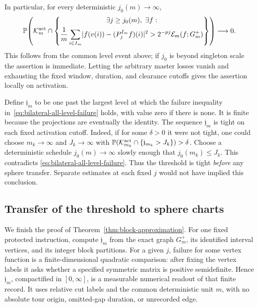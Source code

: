 In particular, for every deterministic \(j_0(m)\to\infty\),
\begin{equation}
\label{eq:bilateral-all-level-failure}
 \mathbb P\!\left(
 \mathcal K_m^{\mathrm{act}}\cap
 \left\{
 \begin{gathered}
 \exists j\ge j_0(m),\ \exists f:\\
 \frac1m\sum_{i\in I_m}
 \lvert f(v(i))-(P_j^{I_m}f)(i)\rvert^2
 >2^{-pj}\mathcal E_m(f;G_m^+)
 \end{gathered}
 \right\}\right)\longrightarrow0.
\end{equation}
This follows from the common level event above;
if \(j_0\) is beyond singleton scale the assertion is
immediate.  Letting the arbitrary master losses vanish and
exhausting the fixed window, duration, and clearance cutoffs
gives the assertion locally on activation.

Define \(\mathfrak j_m\) to be one past the largest level at which
the failure inequality in~\eqref{eq:bilateral-all-level-failure} holds, with value
zero if there is none.  It is finite because the projections
are eventually the identity.  The sequence
\(\mathfrak j_m\) is tight on each fixed activation cutoff.
Indeed, if for some \(\delta>0\) it were not tight, one
could choose \(m_k\to\infty\) and \(J_k\to\infty\) with
\(\mathbb P(\mathcal K_{m_k}^{\mathrm{act}}\cap
\{\mathfrak j_{m_k}>J_k\})>\delta\).
Choose a deterministic schedule \(j_0(m)\to\infty\) slowly
enough that \(j_0(m_k)\le J_k\).  This contradicts
\eqref{eq:bilateral-all-level-failure}.  Thus the threshold
is tight \emph{before} any sphere transfer.  Separate
estimates at each fixed \(j\) would not have implied this
conclusion.

\subsection{Transfer of the threshold to sphere charts}

We finish the proof of Theorem~\ref{thm:block-approximation}.
For one fixed protected instruction, compute
\(\mathfrak j_m\) from the exact graph \(G_m^+\), its
identified interval vertices, and its integer block partitions.
For a given \(j\), failure for some vertex function is a
finite-dimensional quadratic comparison: after fixing the
vertex labels it asks whether a specified symmetric matrix
is positive semidefinite.  Hence \(\mathfrak j_m\), compactified
in \([0,\infty]\), is a measurable numerical readout of that
finite record.  It uses relative cut labels and the common
deterministic unit \(m\), with no absolute tour origin,
omitted-gap duration, or unrecorded edge.

